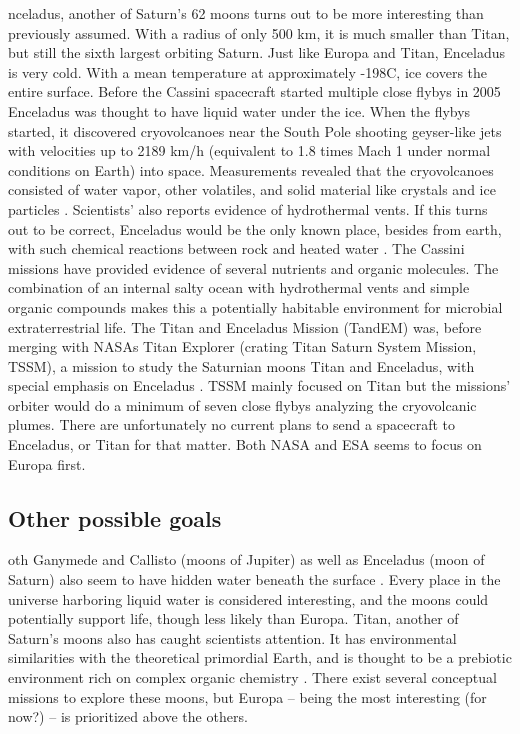 \begin{multicols}{2}

 
nceladus, another of Saturn’s 62 moons turns out to be more interesting than previously assumed.
With a radius of only 500 km, it is much smaller than Titan, but still the sixth largest orbiting Saturn.
Just like Europa and Titan, Enceladus is very cold.
With a mean temperature at approximately -198\degree C, ice covers the entire surface.
Before the Cassini spacecraft started multiple close flybys in 2005 Enceladus was thought to have liquid water under the ice.
When the flybys started, it discovered cryovolcanoes near the South Pole shooting geyser-like jets with velocities up to 2189 km/h (equivalent to 1.8 times Mach 1 under normal conditions on Earth) into space.
Measurements revealed that the cryovolcanoes consisted of water vapor, other volatiles, and solid material like crystals and ice particles \cite{Enceladus1}.
Scientists’ also reports evidence of hydrothermal vents.
If this turns out to be correct, Enceladus would be the only known place, besides from earth, with such chemical reactions between rock and heated water \cite{FPlan09}.
The Cassini missions have provided evidence of several nutrients and organic molecules.
The combination of an internal salty ocean with hydrothermal vents and simple organic compounds makes this a potentially habitable environment for microbial extraterrestrial life.
The Titan and Enceladus Mission (TandEM) was, before merging with NASAs Titan Explorer (crating Titan Saturn System Mission, TSSM), a mission to study the Saturnian moons Titan and Enceladus, with special emphasis on Enceladus \cite{FPlan11}.
TSSM mainly focused on Titan but the missions’ orbiter would do a minimum of seven close flybys analyzing the cryovolcanic plumes.
There are unfortunately no current plans to send a spacecraft to Enceladus, or Titan for that matter.
Both NASA and ESA seems to focus on Europa first.
\fi

\subsection{Other possible goals}

oth Ganymede and Callisto (moons of Jupiter) as well as Enceladus (moon of Saturn) also seem to have hidden water beneath the surface \cite{FPlan09}.
Every place in the universe harboring liquid water is considered interesting, and the moons could potentially support life, though less likely than Europa.
Titan, another of Saturn’s moons also has caught scientists attention.
It has environmental similarities with the theoretical primordial Earth, and is thought to be a prebiotic environment rich on complex organic chemistry \cite{RichOrganics}.
There exist several conceptual missions to explore these moons, but Europa – being the most interesting (for now?) – is prioritized above the others.


\end{multicols}
